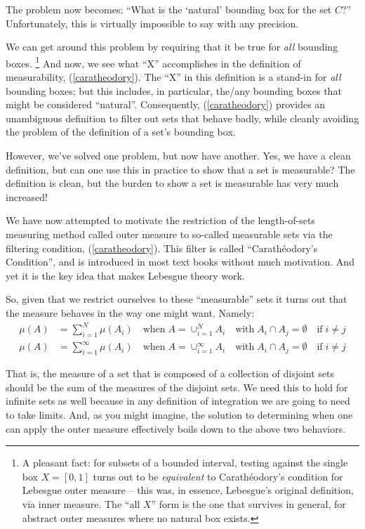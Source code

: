 \documentclass{article}
\begin{document}
The problem now becomes: ``What is the `natural' bounding box for the set $C$?''
Unfortunately, this is virtually impossible to say with any precision.

We can get around this problem by requiring that it be true for {\em all\/}
bounding boxes.%
\footnote{A pleasant fact: for subsets of a bounded interval, testing against
the single box $X = [0,1]$ turns out to be {\em equivalent\/} to
Carath\'eodory's condition for Lebesgue outer measure -- this was, in
essence, Lebesgue's original definition, via inner measure.  The
``all $X$'' form is the one that survives in general, for abstract outer
measures where no natural box exists.}
And now, we see what ``X'' accomplishes in the definition of
measurability, (\ref{caratheodory}). The ``X'' in this definition is a stand-in for 
{\em all\/} bounding boxes; but this includes, in particular, the/any 
bounding boxes that might be considered ``natural''. 
Consequently, (\ref{caratheodory}) provides an unambiguous definition to filter out 
sets that behave badly, while cleanly avoiding 
the problem of the definition of a set's bounding box.

However, we've solved one problem, but now have another. Yes, we have 
a clean definition, but can one use this in practice to show that a 
set is measurable? The definition is clean, but the burden to show a set is
measurable has very much increased!

We have now attempted to motivate the restriction of the length-of-sets 
measuring method called outer measure to so-called measurable sets via 
the filtering condition, (\ref{caratheodory}).
This filter is called ``Carath\'eodory's Condition'',
and is introduced in most text books without much motivation. 
And yet it is the key idea that makes Lebesgue theory work. 
 
So, given that we restrict ourselves to these ``measurable'' sets it turns out that
the measure behaves in the way one might want. Namely:
\begin{align*}
	\mu(A) &= \sum_{i=1}^N \mu(A_i) \quad \text{when} \; 
		A = \mathop{\cup}_{i=1}^N A_i \quad \text{with} \;  
		A_i \cap A_j = \emptyset \quad \text{if} \; i \neq j \\
	\mu(A) &= \sum_{i=1}^\infty \mu(A_i) \quad \text{when} \; 
		A = \mathop{\cup}_{i=1}^\infty A_i \quad \text{with} \; 
		A_i \cap A_j = \emptyset \quad \text{if} \; i \neq j
\end{align*}

That is, the measure of a set that is composed of a collection of disjoint 
sets should be the sum of the measures of the disjoint sets. We need this to hold
for infinite sets as well because in any definition of integration we are going 
to need to take limits.
And, as you might imagine, the solution to determining when one can apply the 
outer measure effectively boils down to the above two behaviors.
\end{document}

